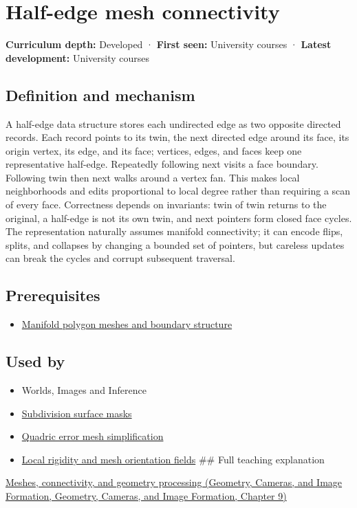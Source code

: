 \hypertarget{appendix-1aea26b2307f}{}\label{referencestart:appendix-1aea26b2307f}
\section{Half-edge mesh connectivity}\label{appendix-1aea26b2307f-half-edge-mesh-connectivity}

\textbf{Curriculum depth:} Developed · \textbf{First seen:} University courses · \textbf{Latest development:} University courses

\subsection{Definition and mechanism}\label{appendix-1aea26b2307f-definition-and-mechanism}

A half-edge data structure stores each undirected edge as two opposite directed records. Each record points to its twin, the next directed edge around its face, its origin vertex, its edge, and its face; vertices, edges, and faces keep one representative half-edge. Repeatedly following next visits a face boundary. Following twin then next walks around a vertex fan. This makes local neighborhoods and edits proportional to local degree rather than requiring a scan of every face. Correctness depends on invariants: twin of twin returns to the original, a half-edge is not its own twin, and next pointers form closed face cycles. The representation naturally assumes manifold connectivity; it can encode flips, splits, and collapses by changing a bounded set of pointers, but careless updates can break the cycles and corrupt subsequent traversal.

\subsection{Prerequisites}\label{appendix-1aea26b2307f-prerequisites}

\begin{itemize}
\tightlist
\item
  \hyperref[appendix-fab348609369]{Manifold polygon meshes and boundary structure}
\end{itemize}

\subsection{Used by}\label{appendix-1aea26b2307f-used-by}

\begin{itemize}
\item
  {Worlds, Images and Inference}
\item
  \hyperref[appendix-0234ab7f86b1]{Subdivision surface masks}
\item
  \hyperref[appendix-1dd4ad54ca57]{Quadric error mesh simplification}
\item
  \hyperref[appendix-7107009c505b]{Local rigidity and mesh orientation fields} \#\# Full teaching explanation
\end{itemize}

\href{../03-Geometry-Cameras-and-Image-Formation/main.pdf\#nameddest=03-visual-computing-i-ch002-meshes-connectivity-and-geometry-processing}{Meshes, connectivity, and geometry processing (Geometry, Cameras, and Image Formation, Geometry, Cameras, and Image Formation, Chapter 9)}
